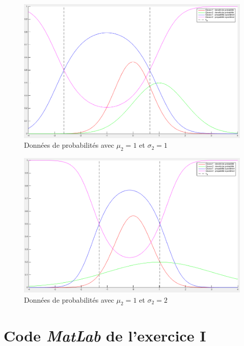 \documentclass[11pt,a4paper]{article}
\begin{document}
\begin{figure}[H]
\center
\includegraphics[width=14cm]{exo1_graph_mu1_sigma1.png}
\caption{Données de probabilités avec $\mu_2 = 1$ et $\sigma_2 = 1$}
\end{figure}

\begin{figure}[H]
\center
\includegraphics[width=14cm]{exo1_graph_mu1_sigma2.png}
\caption{Données de probabilités avec $\mu_2 = 1$ et $\sigma_2 = 2$}
\end{figure}

\newpage
\section{Code \emph{MatLab} de l'exercice I}
\end{document}
